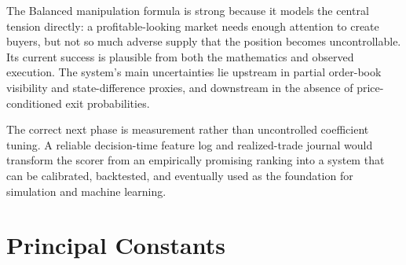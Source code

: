 \documentclass[11pt,a4paper]{article}
\begin{document}
The Balanced manipulation formula is strong because it models the central tension directly:
a profitable-looking market needs enough attention to create buyers, but not so much adverse
supply that the position becomes uncontrollable. Its current success is plausible from both
the mathematics and observed execution. The system's main uncertainties lie upstream in
partial order-book visibility and state-difference proxies, and downstream in the absence of
price-conditioned exit probabilities.

The correct next phase is measurement rather than uncontrolled coefficient tuning. A reliable
decision-time feature log and realized-trade journal would transform the scorer from an
empirically promising ranking into a system that can be calibrated, backtested, and eventually
used as the foundation for simulation and machine learning.

\clearpage
\appendix
\section{Principal Constants}
\end{document}
